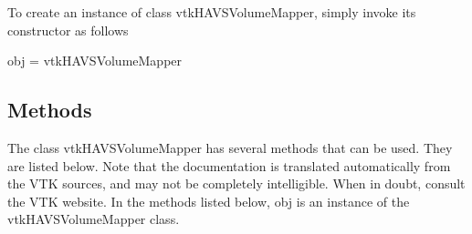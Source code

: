 To create an instance of class vtk\-H\-A\-V\-S\-Volume\-Mapper, simply invoke its constructor as follows \begin{DoxyVerb}  obj = vtkHAVSVolumeMapper
\end{DoxyVerb}
 \hypertarget{vtkwidgets_vtkxyplotwidget_Methods}{}\subsection{Methods}\label{vtkwidgets_vtkxyplotwidget_Methods}
The class vtk\-H\-A\-V\-S\-Volume\-Mapper has several methods that can be used. They are listed below. Note that the documentation is translated automatically from the V\-T\-K sources, and may not be completely intelligible. When in doubt, consult the V\-T\-K website. In the methods listed below, {\ttfamily obj} is an instance of the vtk\-H\-A\-V\-S\-Volume\-Mapper class. 
